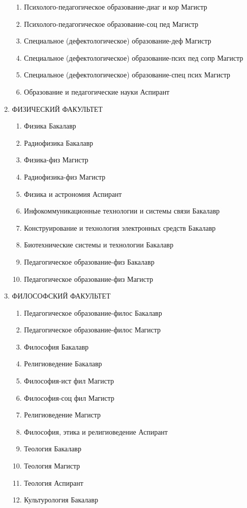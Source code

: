 \begin{enumerate}
\begin{enumerate}
\item Психолого-педагогическое образование-диаг и кор	Магистр
\item Психолого-педагогическое образование-соц пед	Магистр
\item Специальное (дефектологическое) образование-деф	Магистр
\item Специальное (дефектологическое) образование-псих пед сопр	Магистр
\item Специальное (дефектологическое) образование-спец псих	Магистр
\item Образование и педагогические науки	Аспирант
\end{enumerate}
\item ФИЗИЧЕСКИЙ ФАКУЛЬТЕТ
\begin{enumerate}
\item Физика	Бакалавр
\item Радиофизика	Бакалавр
\item Физика-физ	Магистр
\item Радиофизика-физ	Магистр
\item Физика и астрономия	Аспирант
\item Инфокоммуникационные технологии и системы связи	Бакалавр
\item Конструирование и технология электронных средств	Бакалавр
\item Биотехнические системы и технологии	Бакалавр
\item Педагогическое образование-физ	Бакалавр
\item Педагогическое образование-физ	Магистр
\end{enumerate}
\item ФИЛОСОФСКИЙ ФАКУЛЬТЕТ
\begin{enumerate}
\item Педагогическое образование-филос	Бакалавр
\item Педагогическое образование-филос	Магистр
\item Философия	Бакалавр
\item Религиоведение	Бакалавр
\item Философия-ист фил	Магистр
\item Философия-соц фил	Магистр
\item Религиоведение	Магистр
\item Философия, этика и религиоведение	Аспирант
\item Теология	Бакалавр
\item Теология	Магистр
\item Теология	Аспирант
\item Культурология	Бакалавр

\end{enumerate}
\end{enumerate}
